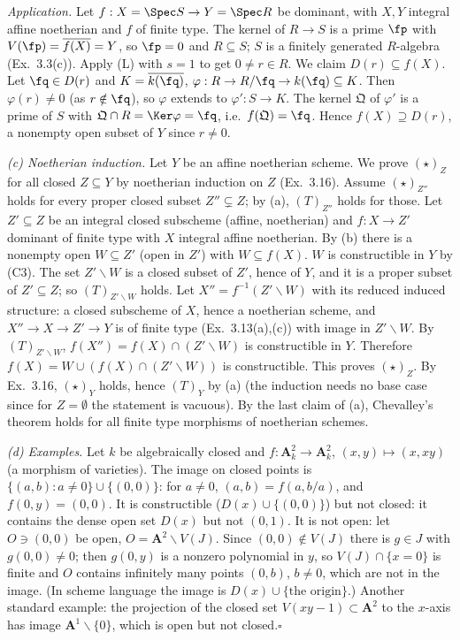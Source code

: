 \documentclass[11pt]{article}
\begin{document}
\emph{Application.} Let $f:X=\Spec S\to Y=\Spec R$ be dominant, with $X,Y$ integral affine noetherian and $f$ of finite type. The kernel of $R\to S$ is a prime $\fp$ with $V(\fp)=\overline{f(X)}=Y$, so $\fp=0$ and $R\subseteq S$; $S$ is a finitely generated $R$-algebra (Ex.~3.3(c)). Apply (L) with $s=1$ to get $0\ne r\in R$. We claim $D(r)\subseteq f(X)$. Let $\fq\in D(r)$ and $K=\overline{k(\fq)}$, $\varphi:R\to R/\fq\to k(\fq)\subseteq K$. Then $\varphi(r)\ne0$ (as $r\notin\fq$), so $\varphi$ extends to $\varphi':S\to K$. The kernel $\mathfrak Q$ of $\varphi'$ is a prime of $S$ with $\mathfrak Q\cap R=\Ker\varphi=\fq$, i.e.\ $f(\mathfrak Q)=\fq$. Hence $f(X)\supseteq D(r)$, a nonempty open subset of $Y$ since $r\ne0$.

\emph{(c) Noetherian induction.} Let $Y$ be an affine noetherian scheme. We prove $(\star)_Z$ for all closed $Z\subseteq Y$ by noetherian induction on $Z$ (Ex.~3.16). Assume $(\star)_{Z''}$ holds for every proper closed subset $Z''\subsetneq Z$; by (a), $(T)_{Z''}$ holds for those. Let $Z'\subseteq Z$ be an integral closed subscheme (affine, noetherian) and $f:X\to Z'$ dominant of finite type with $X$ integral affine noetherian. By (b) there is a nonempty open $W\subseteq Z'$ (open in $Z'$) with $W\subseteq f(X)$. $W$ is constructible in $Y$ by (C3). The set $Z'\smallsetminus W$ is a closed subset of $Z'$, hence of $Y$, and it is a proper subset of $Z'\subseteq Z$; so $(T)_{Z'\smallsetminus W}$ holds. Let $X''=f^{-1}(Z'\smallsetminus W)$ with its reduced induced structure: a closed subscheme of $X$, hence a noetherian scheme, and $X''\to X\to Z'\to Y$ is of finite type (Ex.~3.13(a),(c)) with image in $Z'\smallsetminus W$. By $(T)_{Z'\smallsetminus W}$, $f(X'')=f(X)\cap(Z'\smallsetminus W)$ is constructible in $Y$. Therefore $f(X)=W\cup(f(X)\cap(Z'\smallsetminus W))$ is constructible. This proves $(\star)_Z$. By Ex.~3.16, $(\star)_Y$ holds, hence $(T)_Y$ by (a) (the induction needs no base case since for $Z=\emptyset$ the statement is vacuous). By the last claim of (a), Chevalley's theorem holds for all finite type morphisms of noetherian schemes.

\emph{(d) Examples.} Let $k$ be algebraically closed and $f:\mathbf A^2_k\to\mathbf A^2_k$, $(x,y)\mapsto(x,xy)$ (a morphism of varieties). The image on closed points is $\{(a,b):a\ne0\}\cup\{(0,0)\}$: for $a\ne0$, $(a,b)=f(a,b/a)$, and $f(0,y)=(0,0)$. It is constructible ($D(x)\cup\{(0,0)\}$) but not closed: it contains the dense open set $D(x)$ but not $(0,1)$. It is not open: let $O\ni(0,0)$ be open, $O=\mathbf A^2\smallsetminus V(J)$. Since $(0,0)\notin V(J)$ there is $g\in J$ with $g(0,0)\ne0$; then $g(0,y)$ is a nonzero polynomial in $y$, so $V(J)\cap\{x=0\}$ is finite and $O$ contains infinitely many points $(0,b)$, $b\ne0$, which are not in the image. (In scheme language the image is $D(x)\cup\{\text{the origin}\}$.) Another standard example: the projection of the closed set $V(xy-1)\subset\mathbf A^2$ to the $x$-axis has image $\mathbf A^1\smallsetminus\{0\}$, which is open but not closed.\hfill$\square$
\end{document}
